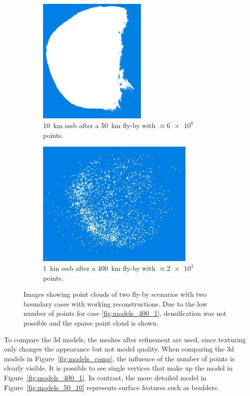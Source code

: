 \begin{figure}[htb]
    \centering
        \begin{subfigure}[b]{0.42\textwidth}
            \centering
            \includegraphics[width=\textwidth,height=6.2cm]{doc/thesis/0_figures/models_quality/50_10/120_50_10_dense2.png}
            \caption{\SI{10}{\kilo\meter} \gls{sssb} after a \SI{50}{\kilo\meter} fly-by with $\approx\SI{6e6}{}$ points.}
            \label{fig:points_50_10}
        \end{subfigure}
        \begin{subfigure}[b]{0.42\textwidth}
            \centering
            \includegraphics[width=\textwidth,height=6.2cm]{doc/thesis/0_figures/models_quality/400_1/120_400_1_points2.png}
            \caption{\SI{1}{\kilo\meter} \gls{sssb} after a \SI{400}{\kilo\meter} fly-by with $\approx\SI{2e3}{}$ points.}
            \label{fig:points_400_1}
        \end{subfigure}
    \caption{Images showing point clouds of two fly-by scenarios with two boundary cases with working reconstructions. Due to the low number of points for case \ref{fig:models_400_1}, densification was not possible and the sparse point cloud is shown.}
    \label{fig:points_dense_comp}
\end{figure}

To compare the \gls{3d} models, the meshes after refinement are used, since texturing only changes the appearance but not model quality. When comparing the \gls{3d} models in Figure~\ref{fig:models_comp}, the influence of the number of points is clearly visible. It is possible to see single vertices that make up the model in Figure~\ref{fig:models_400_1}. In contrast, the more detailed model in Figure~\ref{fig:models_50_10} represents surface features such as boulders.

